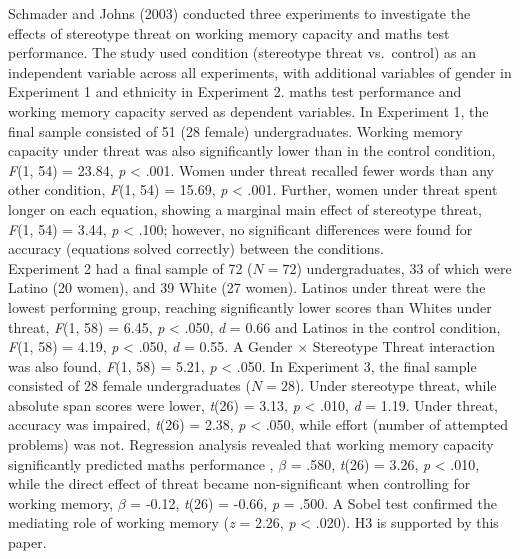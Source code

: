\documentclass[
  stu, a4paper, 12pt,mask,floatsintext]{apa7}
\begin{document}
Schmader and Johns (2003) conducted three experiments to investigate the effects of stereotype threat on working memory capacity and maths test performance.
The study used condition (stereotype threat vs.~control) as an independent variable across all experiments, with additional variables of gender in Experiment 1 and ethnicity in Experiment 2.
maths test performance and working memory capacity served as dependent variables.
In Experiment 1, the final sample consisted of 51 (28 female) undergraduates.
Working memory capacity under threat was also significantly lower than in the control condition, \emph{F}(1, 54) = 23.84, \emph{p} \textless{} .001.
Women under threat recalled fewer words than any other condition, \emph{F}(1, 54) = 15.69, \emph{p} \textless{} .001.
Further, women under threat spent longer on each equation, showing a marginal main effect of stereotype threat, \emph{F}(1, 54) = 3.44, \emph{p} \textless{} .100; however, no significant differences were found for accuracy (equations solved correctly) between the conditions.\\
Experiment 2 had a final sample of 72 (\(N = 72\)) undergraduates, 33 of which were Latino (20 women), and 39 White (27 women).
Latinos under threat were the lowest performing group, reaching significantly lower scores than Whites under threat, \emph{F}(1, 58) = 6.45, \emph{p} \textless{} .050, \emph{d} = 0.66 and Latinos in the control condition, \emph{F}(1, 58) = 4.19, \emph{p} \textless{} .050, \emph{d} = 0.55.
A Gender \(\times\) Stereotype Threat interaction was also found, \emph{F}(1, 58) = 5.21, \emph{p} \textless{} .050.
In Experiment 3, the final sample consisted of 28 female undergraduates (\(N = 28\)).
Under stereotype threat, while absolute span scores were lower, \emph{t}(26) = 3.13, \emph{p} \textless{} .010, \emph{d} = 1.19.
Under threat, accuracy was impaired, \emph{t}(26) = 2.38, \emph{p} \textless{} .050, while effort (number of attempted problems) was not.
Regression analysis revealed that working memory capacity significantly predicted maths performance , \(\beta\) = .580, \emph{t}(26) = 3.26, \emph{p} \textless{} .010, while the direct effect of threat became non-significant when controlling for working memory, \(\beta\) = -0.12, \emph{t}(26) = -0.66, \emph{p} = .500.
A Sobel test confirmed the mediating role of working memory (\emph{z} = 2.26, \emph{p} \textless{} .020).
H3 is supported by this paper.
\end{document}
